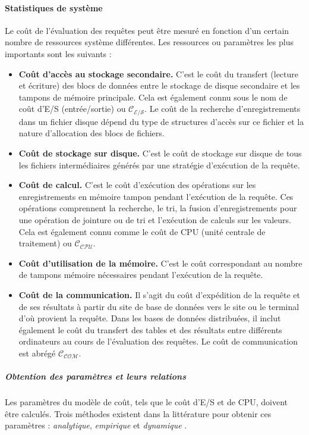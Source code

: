 \paragraph{Statistiques de système}\label{sec:costModelPram}
Le coût de l'évaluation des requêtes peut être mesuré en fonction d'un certain nombre de ressources système différentes. Les ressources ou paramètres les plus importants sont les suivants :

\begin{itemize}
 \item \textbf{Coût d'accès au stockage secondaire.} C'est le coût du transfert (lecture et écriture) des blocs de données entre le stockage de disque secondaire et les tampons de mémoire principale. Cela est également connu sous le nom de coût d'E/S (entrée/sortie) ou $\mathcal{C_{E/S}}$. Le coût de la recherche d'enregistrements dans un fichier disque dépend du type de structures d'accès sur ce fichier et la nature d'allocation des blocs de fichiers.
 \item \textbf{Coût de stockage sur disque.} C'est le coût de stockage sur disque de tous les fichiers intermédiaires générés par une stratégie d'exécution de la requête.
 \item \textbf{Coût de calcul.} C'est le coût d'exécution des opérations sur les enregistrements en mémoire tampon pendant l'exécution de la requête. Ces opérations comprennent la recherche, le tri, la fusion d'enregistrements pour une opération de jointure ou de tri et l'exécution de calculs sur les valeurs. Cela est également connu comme le coût de CPU (unité centrale de traitement) ou $\mathcal{C_{CPU}}$.
 \item \textbf{Coût d'utilisation de la mémoire.} C'est le coût correspondant au nombre de tampons mémoire nécessaires pendant l'exécution de la requête.
 \item \textbf{Coût de la communication.} Il s'agit du coût d'expédition de la requête et de ses résultats à partir du site de base de données vers le site ou le terminal d'où provient la requête. Dans les bases de données distribuées, il inclut également le coût du transfert des tables et des résultats entre différents ordinateurs au cours de l'évaluation des requêtes. Le coût de communication est abrégé $\mathcal{C_{COM}}$.
\end{itemize}

\subparagraph{Obtention des paramètres et leurs relations}
Les paramètres du modèle de coût, tels que le coût d'E/S et de CPU, doivent être calculés. Trois méthodes existent dans la littérature pour obtenir ces paramètres : \textit{analytique}, \textit{empirique} et \textit{dynamique} \cite{Ozsu11}.

